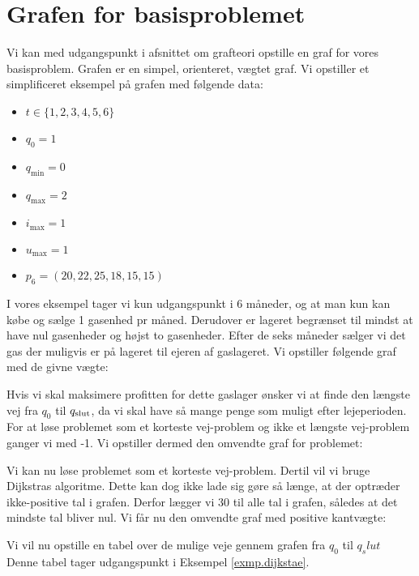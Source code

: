 \section{Grafen for basisproblemet}
Vi kan med udgangspunkt i afsnittet om grafteori opstille en graf for vores basisproblem. Grafen er en simpel, orienteret, vægtet graf. Vi opstiller et simplificeret eksempel på grafen med følgende data:
\begin{itemize}
  \item $t \in \{1,2,3,4,5,6\}$
  \item $q_{0}=1$
  \item $q_{\min}=0$
  \item $q_{\max}=2$
  \item $i_{\max}=1$
  \item $u_{\max}=1$
  \item $p_{6}=(20,22,25,18,15,15)$
\end{itemize}

I vores eksempel tager vi kun udgangspunkt i 6 måneder, og at man kun kan købe og sælge 1 gasenhed pr måned. Derudover er lageret begrænset til mindst at have nul gasenheder og højst to gasenheder. Efter de seks måneder sælger vi det gas der muligvis er på lageret til ejeren af gaslageret. Vi opstiller følgende graf med de givne vægte:



Hvis vi skal maksimere profitten for dette gaslager ønsker vi at finde den længste vej fra $q_{0}$ til $q_{\textrm{slut}}$, da vi skal have så mange penge som muligt efter lejeperioden. For at løse problemet som et korteste vej-problem og ikke et længste vej-problem ganger vi med -1. Vi opstiller dermed den omvendte graf for problemet:



Vi kan nu løse problemet som et korteste vej-problem. Dertil vil vi bruge Dijkstras algoritme. Dette kan dog ikke lade sig gøre så længe, at der optræder ikke-positive tal i grafen. Derfor lægger vi 30 til alle tal i grafen, således at det mindste tal bliver nul. Vi får nu den omvendte graf med positive kantvægte:




Vi vil nu opstille en tabel over de mulige veje gennem grafen fra $q_0$ til $q_slut$ Denne tabel tager udgangspunkt i Eksempel \ref{exmp.dijkstae}.

 


